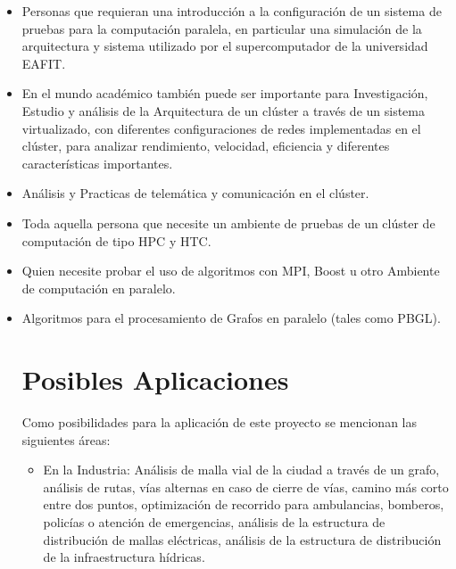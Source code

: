 \begin{itemize}
	
	\item Personas que requieran una introducción a la configuración de un sistema de pruebas para la computación paralela, en particular una simulación de la arquitectura y sistema utilizado por el supercomputador de la universidad EAFIT.

	\item En el mundo académico también puede ser importante para Investigación, Estudio y análisis de la Arquitectura de un clúster a través de un sistema virtualizado, con diferentes configuraciones de redes implementadas en el clúster, para analizar rendimiento, velocidad, eficiencia y diferentes características importantes. 


	\item Análisis y Practicas de telemática y comunicación en el clúster. 

	\item Toda aquella persona que necesite un ambiente de pruebas de un clúster de computación  de tipo HPC y HTC.

	\item Quien necesite probar el uso de algoritmos con MPI, Boost u otro Ambiente de computación en paralelo.

	\item Algoritmos para el procesamiento de Grafos en paralelo (tales como PBGL).

	\section{Posibles Aplicaciones}

	Como posibilidades para la aplicación de este proyecto se mencionan las siguientes áreas: 

	\begin{itemize}
		\item En la Industria: Análisis de malla vial de la ciudad a través de un grafo, análisis de rutas, vías alternas en caso de cierre de vías, camino más corto entre dos puntos, optimización de recorrido para ambulancias, bomberos, policías o atención de emergencias, análisis de la estructura de distribución de mallas eléctricas, análisis de la estructura de distribución de la infraestructura hídricas.



\end{itemize}
\end{itemize}
